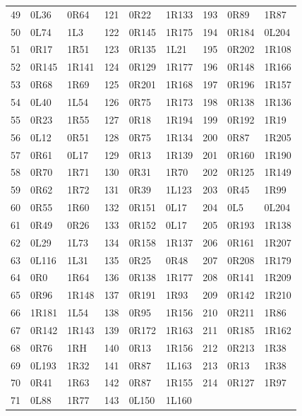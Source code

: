\begin{longtable}{rll@{\quad}rll@{\quad}rll}
49 & 0L36 & 0R64 & 121 & 0R22 & 1R133 & 193 & 0R89 & 1R87 \\
50 & 0L74 & 1L3 & 122 & 0R145 & 1R175 & 194 & 0R184 & 0L204 \\
51 & 0R17 & 1R51 & 123 & 0R135 & 1L21 & 195 & 0R202 & 1R108 \\
52 & 0R145 & 1R141 & 124 & 0R129 & 1R177 & 196 & 0R148 & 1R166 \\
53 & 0R68 & 1R69 & 125 & 0R201 & 1R168 & 197 & 0R196 & 1R157 \\
54 & 0L40 & 1L54 & 126 & 0R75 & 1R173 & 198 & 0R138 & 1R136 \\
55 & 0R23 & 1R55 & 127 & 0R18 & 1R194 & 199 & 0R192 & 1R19 \\
56 & 0L12 & 0R51 & 128 & 0R75 & 1R134 & 200 & 0R87 & 1R205 \\
57 & 0R61 & 0L17 & 129 & 0R13 & 1R139 & 201 & 0R160 & 1R190 \\
58 & 0R70 & 1R71 & 130 & 0R31 & 1R70 & 202 & 0R125 & 1R149 \\
59 & 0R62 & 1R72 & 131 & 0R39 & 1L123 & 203 & 0R45 & 1R99 \\
60 & 0R55 & 1R60 & 132 & 0R151 & 0L17 & 204 & 0L5 & 0L204 \\
61 & 0R49 & 0R26 & 133 & 0R152 & 0L17 & 205 & 0R193 & 1R138 \\
62 & 0L29 & 1L73 & 134 & 0R158 & 1R137 & 206 & 0R161 & 1R207 \\
63 & 0L116 & 1L31 & 135 & 0R25 & 0R48 & 207 & 0R208 & 1R179 \\
64 & 0R0 & 1R64 & 136 & 0R138 & 1R177 & 208 & 0R141 & 1R209 \\
65 & 0R96 & 1R148 & 137 & 0R191 & 1R93 & 209 & 0R142 & 1R210 \\
66 & 1R181 & 1L54 & 138 & 0R95 & 1R156 & 210 & 0R211 & 1R86 \\
67 & 0R142 & 1R143 & 139 & 0R172 & 1R163 & 211 & 0R185 & 1R162 \\
68 & 0R76 & 1RH & 140 & 0R13 & 1R156 & 212 & 0R213 & 1R38 \\
69 & 0L193 & 1R32 & 141 & 0R87 & 1L163 & 213 & 0R13 & 1R38 \\
70 & 0R41 & 1R63 & 142 & 0R87 & 1R155 & 214 & 0R127 & 1R97 \\
71 & 0L88 & 1R77 & 143 & 0L150 & 1L160 &  &  &  \\
\end{longtable}\endgroup

